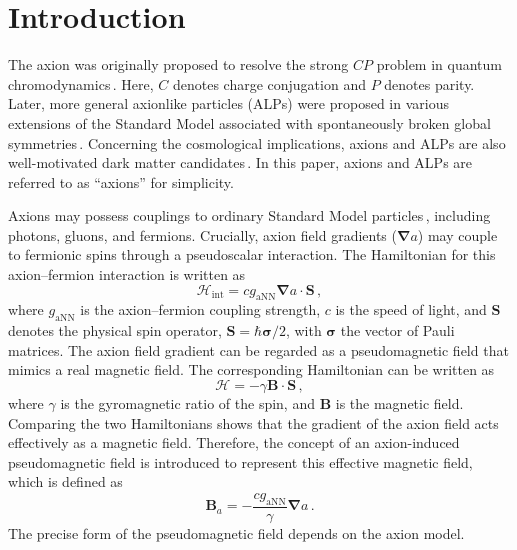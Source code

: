 ﻿\section{Introduction}

The axion was originally proposed to resolve the strong $CP$ problem in quantum chromodynamics\,\cite{PecceiQuinn1977_ConstraintsCP_PRD,Weinberg1978_NewLightBoson,PecceiQuinn1977_CPConservation_PRL,Wilczek1978_ProblemStrongPAndT}. 
Here, $C$ denotes charge conjugation and $P$ denotes parity. 
Later, more general axionlike particles (ALPs) were proposed in various extensions of the Standard Model associated with spontaneously broken global symmetries\,\cite{svrcek2006axions,Kim1987_LightPseudoscalars,JaeckelRingwald2010_ALPReview,Arvanitaki2010_StringAxiverse}. 
Concerning the cosmological implications, axions and ALPs are also well-motivated dark matter candidates\,\cite{Preskill1983_invisible_axion,Abbott1983_CosmologicalBoundAxion,Dine1983_not_so_harmless_axion,KhlopovMalomedZeldovich1985,Marsh2016_AxionCosmology}.
In this paper, axions and ALPs are referred to as ``axions'' for simplicity. 

Axions may possess couplings to ordinary Standard Model particles\,\cite{Graham2013_Newobservables}, including photons, gluons, and fermions. 
Crucially, axion field gradients ($\boldsymbol{\nabla}a$) may couple to fermionic spins through a pseudoscalar interaction. 
The Hamiltonian for this axion--fermion interaction is written as
\begin{equation}
    \mathcal{H}_{\mathrm{int}} = c g_\mathrm{aNN} \boldsymbol{\nabla}a \cdot \boldsymbol{S}\,,
\end{equation}
where $g_\mathrm{aNN}$ is the axion--fermion coupling strength, $c$ is the speed of light, and $\boldsymbol{S}$ denotes the physical spin operator, $\boldsymbol{S}=\hbar\boldsymbol{\sigma}/2$, with $\boldsymbol{\sigma}$ the vector of Pauli matrices. 
The axion field gradient can be regarded as a pseudomagnetic field that mimics a real magnetic field. The corresponding Hamiltonian can be written as
\begin{equation}
    \mathcal{H} = -\gamma \boldsymbol{B} \cdot \boldsymbol{S} \,,
\end{equation} 
where $\gamma$ is the gyromagnetic ratio of the spin, and $\boldsymbol{B}$ is the magnetic field. 
Comparing the two Hamiltonians shows that the gradient of the axion field acts effectively as a magnetic field. 
Therefore, the concept of an axion-induced pseudomagnetic field is introduced to represent this effective magnetic field, which is defined as
\begin{equation}
    \boldsymbol{B}_a = -\frac{c g_\mathrm{aNN}}{\gamma}\boldsymbol{\nabla}a\,.
\end{equation}
The precise form of the pseudomagnetic field depends on the axion model.

